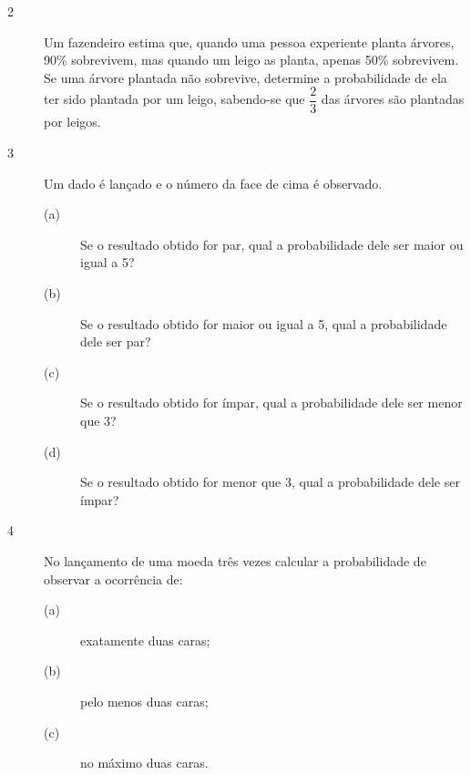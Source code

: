 \documentclass{report}
\begin{document}
\begin{description}

\item[{\large 2}] Um fazendeiro estima que, quando uma pessoa experiente planta árvores, 90\% sobrevivem, mas quando um leigo as planta, apenas 50\% sobrevivem. Se uma árvore plantada não sobrevive, determine a probabilidade de ela ter sido plantada por um leigo, sabendo-se que $\dfrac{2}{3}$ das árvores são plantadas por leigos.

\end{description}

\begin{description}

\item[{\large 3}] Um dado é lançado e o número da face de cima é observado.

\begin{description}

\item[(a)]  { Se o resultado obtido for par, qual a probabilidade dele ser maior ou igual a 5?}

\item[(b)]  { Se o resultado obtido for maior ou igual a 5, qual a probabilidade dele ser par?}

\item[(c)]  { Se o resultado obtido for ímpar, qual a probabilidade dele ser menor que 3?}

\item[(d)]  { Se o resultado obtido for menor que 3, qual a probabilidade dele ser ímpar?}


\end{description}

\end{description}

\begin{description}

\item[{\large 4}] No lançamento de uma moeda três vezes calcular a probabilidade de observar a ocorrência de:

\begin{description}

\item[(a)]  { exatamente duas caras;}

\item[(b)]  { pelo menos duas caras;}

\item[(c)]  { no máximo duas caras.}

\end{description}

\end{description}
\end{document}

